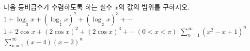 다음 등비급수가 수렴하도록 하는 실수 $x$의 값의 범위를 구하시오.
 $1+\log_{\frac{1}{2}}x+(\log_{\frac{1}{2}}x)^{2}+(\log_{\frac{1}{2}}x)^{3}+\cdots$
 $1+2\cos x+(2\cos x)^{2}+(2\cos x)^{3}+\cdots\ (0<x<\pi)$
 $\displaystyle\sum_{n=1}^{\infty}(x^{2}-x+1)^{n}$
 $\displaystyle\sum_{n=1}^{\infty}(x-4)(x-2)^{n}$
